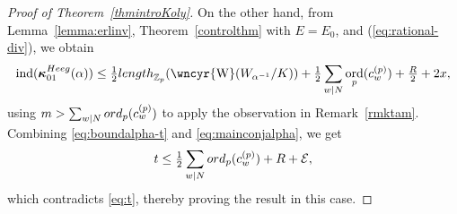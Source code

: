 \documentclass[10pt,reqno]{amsart}
\numberwithin{equation}{section}
\theoremstyle{plain}
\theoremstyle{definition}
\theoremstyle{definition}
\theoremstyle{plain}
\theoremstyle{plain}
\theoremstyle{plain}
\theoremstyle{plain}
\theoremstyle{plain}
\theoremstyle{plain}
\DeclareMathOperator{\ord}{ord}
\newcommand{\ind}{\operatorname{ind}}
\newcommand{\Z}{\mathbb{Z}}
\newcommand{\bkappa}{\boldsymbol{\kappa}}
\newcommand{\sha}{\text{\wncyr{W}}}
\newcommand{\CE}{\mathcal{E}}
\DeclareMathOperator{\loc}{loc}
\newcommand{\Fcal}{\mathcal{F}}
\newcommand{\cL}{\mathcal{L}}
\newcommand{\rH}{\mathrm{H}}
\begin{document}
\begin{proof}[Proof of Theorem~\ref{thmintroKoly}]

On the other hand, from Lemma~\ref{lemma:erlinv}, Theorem~\ref{controlthm} with $E=E_0$, and (\ref{eq:rational-div}), we obtain
\begin{equation}\label{eq:mainconjalpha}
\ind(\bkappa_{01}^{\rm Heeg}(\alpha))\leq\tfrac{1}{2}{\rm length}_{\Z_p}(\sha(W_{\alpha^{-1}}/K))+\tfrac{1}{2}\sum_{w\mid N}\ord_p(c_w^{(p)})+\tfrac{R}{2}+2x,
\end{equation}
using $m>\sum_{w\mid N}{\rm ord}_p(c_w^{(p)})$ to apply the observation in Remark~\ref{rmktam}. Combining \eqref{eq:boundalpha-t} and \eqref{eq:mainconjalpha}, we get
\[
t\leq \tfrac{1}{2}\sum_{w\mid N}{\rm ord}_p(c_w^{(p)})+ R+\CE,
\]
which contradicts \eqref{eq:t}, thereby proving the result in this case.


\end{proof}
\end{document}
